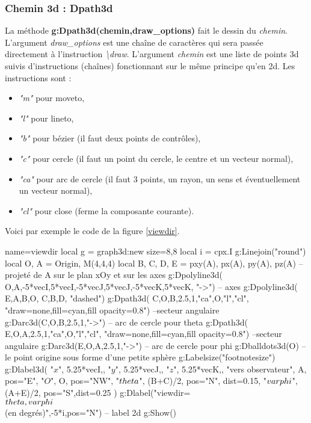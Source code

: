 \subsubsection{Chemin 3d : Dpath3d}

La méthode \textbf{g:Dpath3d(chemin,draw\_options)} fait le dessin du \emph{chemin}. L'argument \emph{draw\_options} est une chaîne de caractères qui sera passée directement à l'instruction \emph{\textbackslash draw}. L'argument \emph{chemin} est une liste de points 3d suivis d'instructions (chaînes) fonctionnant sur le même principe qu'en 2d. Les instructions sont :
    \begin{itemize}
      \item \emph{"m"} pour moveto,
      \item \emph{"l"} pour lineto,
      \item \emph{"b"} pour bézier (il faut deux points de contrôles),
      \item \emph{"c"} pour cercle (il faut un point du cercle, le centre et un vecteur normal),
      \item \emph{"ca"} pour arc de cercle (il faut 3 points, un rayon, un sens et éventuellement un vecteur normal),
      \item \emph{"cl"} pour close (ferme la composante courante).
      \end{itemize}

Voici par exemple le code de la figure \ref{viewdir}.

\begin{Luacode}
\begin{luadraw}{name=viewdir}
local g = graph3d:new{ size={8,8} }
local i = cpx.I
g:Linejoin("round")
local O, A = Origin, M(4,4,4)
local B, C, D, E = pxy(A), px(A), py(A), pz(A) --projeté de A sur le plan xOy et sur les axes
g:Dpolyline3d( {{O,A},{-5*vecI,5*vecI},{-5*vecJ,5*vecJ},{-5*vecK,5*vecK}}, "->") -- axes
g:Dpolyline3d( {{E,A,B,O}, {C,B,D}}, "dashed")
g:Dpath3d( {C,O,B,2.5,1,"ca",O,"l","cl"}, "draw=none,fill=cyan,fill opacity=0.8") --secteur angulaire
g:Darc3d(C,O,B,2.5,1,"->") -- arc de cercle pour theta
g:Dpath3d( {E,O,A,2.5,1,"ca",O,"l","cl"}, "draw=none,fill=cyan,fill opacity=0.8") --secteur angulaire
g:Darc3d(E,O,A,2.5,1,"->") -- arc de cercle pour phi
g:Dballdots3d(O) -- le point origine sous forme d'une petite sphère
g:Labelsize("footnotesize")
g:Dlabel3d(
    "$x$", 5.25*vecI,{}, "$y$", 5.25*vecJ,{}, "$z$", 5.25*vecK,{},
    "vers observateur", A, {pos="E"},
    "$O$", O, {pos="NW"},
    "$\\theta$", (B+C)/2, {pos="N", dist=0.15},
    "$\\varphi$", (A+E)/2, {pos="S",dist=0.25}
)
g:Dlabel("viewdir=\\{$\\theta,\\varphi$\\} (en degrés)",-5*i,{pos="N"}) -- label 2d
g:Show()   
\end{luadraw}      
\end{Luacode}

